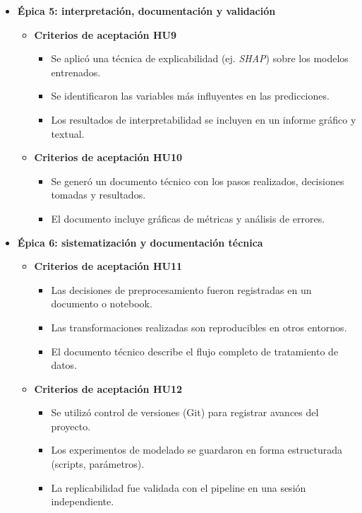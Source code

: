 \documentclass[
11pt, %
]{charter}
\begin{document}
\begin{itemize}
  \item \textbf{Épica 5: interpretación, documentación y validación}
    \begin{itemize}
      \item \textbf{Criterios de aceptación HU9}
      \begin{itemize}
        \item Se aplicó una técnica de explicabilidad (ej. \textit{SHAP}) sobre los modelos entrenados.
        \item Se identificaron las variables más influyentes en las predicciones.
        \item Los resultados de interpretabilidad se incluyen en un informe gráfico y textual.
      \end{itemize}
      \item \textbf{Criterios de aceptación HU10}
      \begin{itemize}
        \item Se generó un documento técnico con los pasos realizados, decisiones tomadas y resultados.
        \item El documento incluye gráficas de métricas y análisis de errores.
      \end{itemize}
    \end{itemize}

  \item \textbf{Épica 6: sistematización y documentación técnica}
    \begin{itemize}
      \item \textbf{Criterios de aceptación HU11}
      \begin{itemize}
        \item Las decisiones de preprocesamiento fueron registradas en un documento o notebook.
        \item Las transformaciones realizadas son reproducibles en otros entornos.
        \item El documento técnico describe el flujo completo de tratamiento de datos.
      \end{itemize}

      \item \textbf{Criterios de aceptación HU12}
      \begin{itemize}
        \item Se utilizó control de versiones (Git) para registrar avances del proyecto.
        \item Los experimentos de modelado se guardaron en forma estructurada (scripts, parámetros).
        \item La replicabilidad fue validada con el pipeline en una sesión independiente.
      \end{itemize}
    \end{itemize}


\end{itemize}
\end{document}
